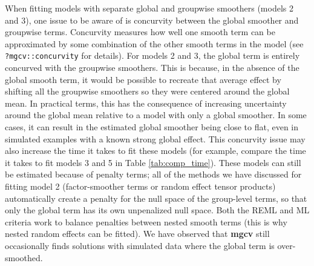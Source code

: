 \documentclass[12pt]{article}
\begin{document}
When fitting models with separate global and groupwise smoothers (models
2 and 3), one issue to be aware of is concurvity between the global
smoother and groupwise terms. Concurvity measures how well one smooth
term can be approximated by some combination of the other smooth terms
in the model (see \texttt{?mgcv::concurvity} for details). For models 2
and 3, the global term is entirely concurved with the groupwise
smoothers. This is because, in the absence of the global smooth term, it
would be possible to recreate that average effect by shifting all the
groupwise smoothers so they were centered around the global mean. In
practical terms, this has the consequence of increasing uncertainty
around the global mean relative to a model with only a global smoother.
In some cases, it can result in the estimated global smoother being
close to flat, even in simulated examples with a known strong global
effect. This concurvity issue may also increase the time it takes to fit
these models (for example, compare the time it takes to fit models 3 and
5 in Table \ref{tab:comp_time}). These models can still be estimated
because of penalty terms; all of the methods we have discussed for
fitting model 2 (factor-smoother terms or random effect tensor products)
automatically create a penalty for the null space of the group-level
terms, so that only the global term has its own unpenalized null space.
Both the REML and ML criteria work to balance penalties between nested
smooth terms (this is why nested random effects can be fitted). We have
observed that \textbf{mgcv} still occasionally finds solutions with
simulated data where the global term is over-smoothed.
\end{document}
